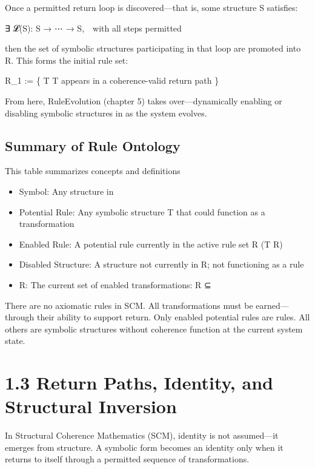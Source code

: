 Once a permitted return loop is discovered---that is, some structure S \in
\Sigma* satisfies:

∃ 𝓛(S): S → ⋯ → S, with all steps permitted

then the set of symbolic structures participating in that loop are
promoted into R. This forms the initial rule set:

R_1 := \{ T \in \Sigma* \textbar{} T appears in a coherence-valid return path \}

From here, RuleEvolution (chapter 5) takes over---dynamically enabling
or disabling symbolic structures in \Sigma* as the system evolves.

\subsection{Summary of Rule Ontology}\label{summary-of-rule-ontology}

This table summarizes concepts and definitions

\begin{itemize}
\item
  Symbol: Any structure in \Sigma*
\item
  Potential Rule: Any symbolic structure T \in \Sigma* that could function as a
  transformation
\item
  Enabled Rule: A potential rule currently in the active rule set R (T \in
  R)
\item
  Disabled Structure: A structure not currently in R; not functioning as
  a rule
\item
  R: The current set of enabled transformations: R ⊆ \Sigma*
\end{itemize}

There are no axiomatic rules in SCM. All transformations must be
earned---through their ability to support return. Only enabled potential
rules are rules. All others are symbolic structures without coherence
function at the current system state.

\section{1.3 \textbar{} Return Paths, Identity, and Structural
Inversion}\label{return-paths-identity-and-structural-inversion}

In Structural Coherence Mathematics (SCM), identity is not assumed---it
emerges from structure. A symbolic form becomes an identity only when it
returns to itself through a permitted sequence of transformations.

